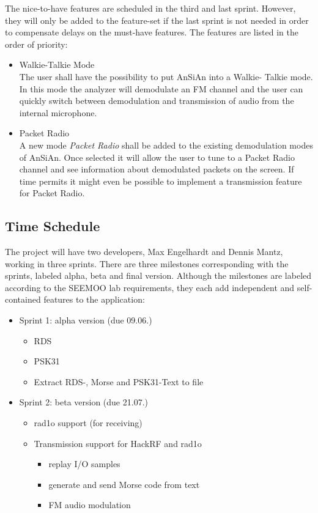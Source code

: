 The nice-to-have features are scheduled in the third and last sprint. However,
they will only be added to the feature-set if the last sprint is not needed
in order to compensate delays on the must-have features. The features are
listed in the order of priority:
\begin{itemize}
	\item Walkie-Talkie Mode \\
		The user shall have the possibility to put AnSiAn into a Walkie-
		Talkie mode. In this mode the analyzer will demodulate an FM channel
		and the user can quickly switch between demodulation and transmission
		of audio from the internal microphone.
	\item Packet Radio \\
		A new mode \emph{Packet Radio} shall be added to the existing
		demodulation modes of AnSiAn. Once selected it will allow the user
		to tune to a Packet Radio channel and see information about 
		demodulated packets on the screen. If time permits it might even
		be possible to implement a transmission feature for Packet Radio.
\end{itemize}


\subsection{Time Schedule}
\label{sec:time_schedule}

The project will have two developers, Max Engelhardt and Dennis Mantz,
working in three sprints. There are three milestones corresponding with
the sprints, labeled alpha, beta and final version. Although the
milestones are labeled according to the SEEMOO lab requirements, they
each add independent and self-contained features to the application:

\begin{itemize}
	\item Sprint 1: alpha version (due 09.06.)
	\begin{itemize}
		\item RDS
		\item PSK31
		\item Extract RDS-, Morse and PSK31-Text to file
	\end{itemize}
\end{itemize}

\begin{itemize}
	\item Sprint 2: beta version (due 21.07.)
	\begin{itemize}
		\item rad1o support (for receiving)
		\item Transmission support for HackRF and rad1o
		\begin{itemize}
			\item replay I/O samples
			\item generate and send Morse code from text
			\item FM audio modulation
		\end{itemize}
	\end{itemize}
\end{itemize}

